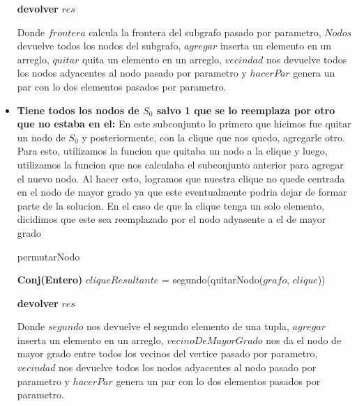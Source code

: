 \begin{itemize}
\begin{algorithm}[H]
    \textbf{devolver} $res$ \\
\end{algorithm}
Donde $frontera$ calcula la frontera del subgrafo pasado por parametro, $Nodos$ devuelve todos los nodos del subgrafo, $agregar$ inserta un elemento en un arreglo, $quitar$ quita un elemento en un arreglo, $vecindad$ nos devuelve todos los nodos adyacentes al nodo pasado por parametro y $hacerPar$ genera un par con lo dos elementos pasados por parametro. \newline

\item \textbf{Tiene todos los nodos de $S_{0}$ salvo 1 que se lo reemplaza por otro que no estaba en el:} \newline
En este subconjunto lo primero que hicimos fue quitar un nodo de $S_{0}$ y posteriormente, con la clique que nos quedo, agregarle otro. Para esto, utilizamos la funcion que quitaba un nodo a la clique y luego, utilizamos la funcion que nos calculaba el subconjunto anterior para agregar el nuevo nodo. Al hacer esto, logramos que nuestra clique no quede centrada en el nodo de mayor grado ya que este eventualmente podria dejar de formar parte de la solucion.
En el caso de que la clique tenga un solo elemento, dicidimos que este sea reemplazado por el nodo adyasente a el de mayor grado \newline
\begin{algorithm}[H]
    \SetAlgoLined
    \caption{permutarNodo}
	
   \textbf{Conj(Entero)} $cliqueResultante$ = segundo(quitarNodo($grafo$, $clique$)) \\


    \textbf{devolver} $res$ \\
\end{algorithm}
Donde $segundo$ nos devuelve el segundo elemento de una tupla,  $agregar$ inserta un elemento en un arreglo, $vecinoDeMayorGrado$ nos da el nodo de mayor grado entre todos los vecinos del vertice pasado por parametro, $vecindad$ nos devuelve todos los nodos adyacentes al nodo pasado por parametro y $hacerPar$ genera un par con lo dos elementos pasados por parametro. \newline
\end{itemize}

